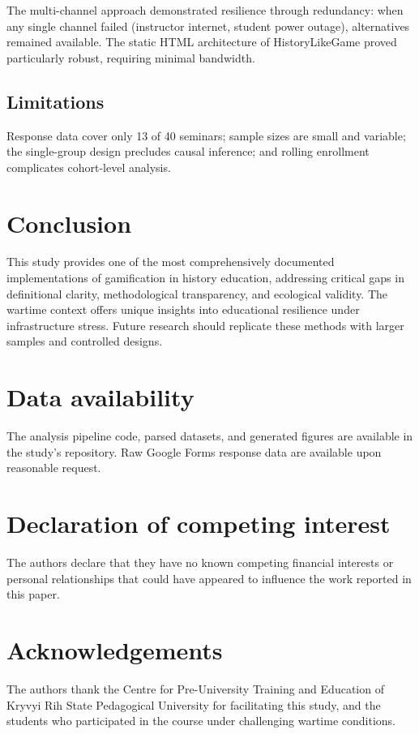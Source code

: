 \documentclass[review]{elsarticle}
\begin{document}
The multi-channel approach demonstrated resilience through redundancy: when any single channel failed (instructor internet, student power outage), alternatives remained available. The static HTML architecture of HistoryLikeGame proved particularly robust, requiring minimal bandwidth.

\subsection{Limitations}

Response data cover only 13 of 40 seminars; sample sizes are small and variable; the single-group design precludes causal inference; and rolling enrollment complicates cohort-level analysis.


\section{Conclusion}

This study provides one of the most comprehensively documented implementations of gamification in history education, addressing critical gaps in definitional clarity, methodological transparency, and ecological validity. The wartime context offers unique insights into educational resilience under infrastructure stress. Future research should replicate these methods with larger samples and controlled designs.


\section*{Data availability}

The analysis pipeline code, parsed datasets, and generated figures are available in the study's repository. Raw Google Forms response data are available upon reasonable request.

\section*{Declaration of competing interest}

The authors declare that they have no known competing financial interests or personal relationships that could have appeared to influence the work reported in this paper.

\section*{Acknowledgements}

The authors thank the Centre for Pre-University Training and Education of Kryvyi Rih State Pedagogical University for facilitating this study, and the students who participated in the course under challenging wartime conditions.


\end{document}
